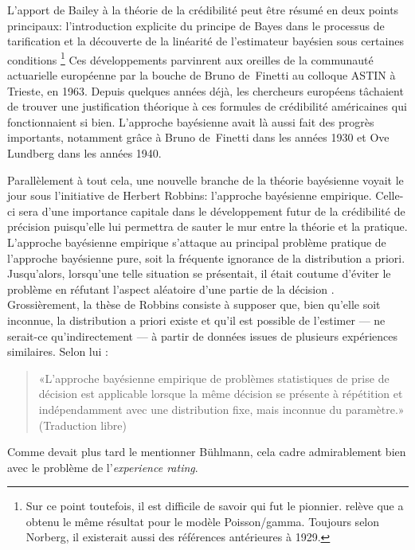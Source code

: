 L'apport de Bailey à la théorie de la crédibilité peut être résumé en
deux points principaux: l'introduction explicite du principe de Bayes
dans le processus de tarification et la découverte de la linéarité de
l'estimateur bayésien sous certaines conditions%
\footnote{Sur ce point toutefois, il est difficile de savoir qui fut
  le pionnier. \cite{Norberg:credibility:1979} relève que
  \cite{Keffer:1929} a obtenu le même résultat pour le modèle
  Poisson/gamma. Toujours selon Norberg, il existerait aussi des
  références antérieures à 1929.} %
Ces développements parvinrent aux oreilles de la communauté
actuarielle européenne par la bouche de Bruno de~Finetti au colloque
ASTIN à Trieste, en 1963. Depuis quelques années déjà, les
chercheurs européens tâchaient de trouver une justification théorique
à ces formules de crédibilité américaines qui fonctionnaient si bien.
L'approche bayésienne avait là aussi fait des progrès importants,
notamment grâce à Bruno de~Finetti dans les années 1930 et Ove Lundberg
dans les années 1940.

Parallèlement à tout cela, une nouvelle branche de la théorie
bayésienne voyait le jour sous l'initiative de Herbert Robbins:
l'approche bayésienne empirique. Celle-ci sera d'une importance
capitale dans le développement futur de la crédibilité de précision
puisqu'elle lui permettra de sauter le mur entre la théorie et la
pratique. L'approche bayésienne empirique
\citep{Robbins:empiricalbayes:1955,Robbins:empiricalbayes:1964}
s'attaque au principal problème pratique de l'approche bayésienne
pure, soit la fréquente ignorance de la distribution a priori.
Jusqu'alors, lorsqu'une telle situation se présentait, il était
coutume d'éviter le problème en réfutant l'aspect aléatoire d'une
partie de la décision \citep{Neyman:1962}. Grossièrement, la thèse de
Robbins consiste à supposer que, bien qu'elle soit inconnue, la
distribution a priori existe et qu'il est possible de l'estimer --- ne
serait-ce qu'indirectement --- à partir de données issues de plusieurs
expériences similaires. Selon lui \citep{Robbins:empiricalbayes:1964}:
\begin{quote}
  «L'approche bayésienne empirique de problèmes statistiques de prise
  de décision est applicable lorsque la même décision se présente à
  répétition et indépendamment avec une distribution fixe, mais
  inconnue du paramètre.» (Traduction libre)
\end{quote}

Comme devait plus tard le mentionner Bühlmann, cela cadre
admirablement bien avec le problème de l'\emph{experience rating}.

